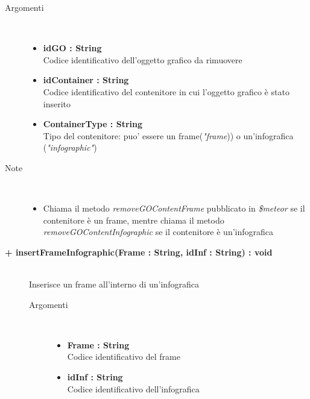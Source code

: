 \begin{description}
\begin{description}
		\begin{description}
			\item[Argomenti] \hfill \\
				\begin{itemize}
					\item \textbf{idGO : String			} \hfill \\
					Codice identificativo dell'oggetto grafico da rimuovere
					\item \textbf{idContainer : String			} \hfill \\
					Codice identificativo del contenitore in cui l'oggetto grafico è stato inserito
					\item \textbf{ContainerType : String			} \hfill \\
					Tipo del contenitore: puo' essere un frame(\textit{"frame})) o un'infografica (\textit{"infographic"})
					
				\end{itemize}
			\item[Note] \hfill \\
			\begin{itemize}
					\item Chiama il metodo \textit{removeGOContentFrame} pubblicato in \textit{\$meteor} se il contenitore è un frame, mentre chiama il metodo \textit{removeGOContentInfographic} se il contenitore è un'infografica
			\end{itemize}
		\end{description}
	\end{description}
	
	\begin{description}
		\item[\textbf{\color{blue}+ insertFrameInfographic(Frame : String, idInf : String) : void			}] \hfill \\
			Inserisce un frame all'interno di un'infografica
			
		\begin{description}
			\item[Argomenti] \hfill \\
				\begin{itemize}
					\item \textbf{Frame : String			} \hfill \\
					Codice identificativo del frame
					\item \textbf{idInf : String			} \hfill \\
					Codice identificativo dell'infografica
					

\end{itemize}
\end{description}
\end{description}
\end{description}
